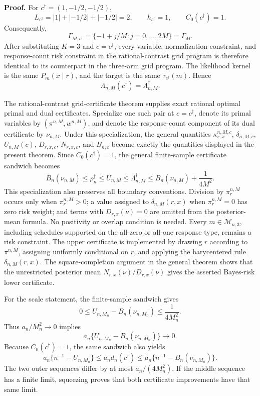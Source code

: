 \textbf{Proof.}
For \(c^\dagger=(1,-1/2,-1/2)\),
\[
 L_{c^\dagger}=|1|+|-1/2|+|-1/2|=2,
 \qquad h_{c^\dagger}=1,
 \qquad C_0(c^\dagger)=1.
\]
Consequently,
\[
 \Gamma_{M,c^\dagger}
 =\{-1+j/M:j=0,\ldots,2M\}
 =\Gamma_M.
\]
After substituting \(K=3\) and \(c=c^\dagger\), every variable, normalization constraint, and response-count risk constraint in the rational-contrast grid program is therefore identical to its counterpart in the three-arm grid program.  The likelihood kernel is the same \(P_m(x\mid r)\), and the target is the same \(\tau_{c^\dagger}(m)\).  Hence
\[
 \Lambda_{n,M}(c^\dagger)=\Lambda_{n,M}^\dagger.
\]

The rational-contrast grid-certificate theorem supplies exact rational optimal primal and dual certificates.  Specialize one such pair at \(c=c^\dagger\), denote its primal variables by \((\pi^{n,M},w^{n,M})\), and denote the response-count component of its dual certificate by \(\nu_{n,M}\).  Under this specialization, the general quantities \(\kappa_{r,x}^{n,M,c}\), \(\delta_{n,M,c}\), \(U_{n,M}(c)\), \(D_{r,x,c}\), \(N_{r,x,c}\), and \(B_{n,c}\) become exactly the quantities displayed in the present theorem.  Since \(C_0(c^\dagger)=1\), the general finite-sample certificate sandwich becomes
\[
 B_n(\nu_{n,M})
 \leq \rho_n^\dagger
 \leq U_{n,M}
 \leq \Lambda_{n,M}^\dagger
 \leq B_n(\nu_{n,M})+\frac{1}{4M^2}.
\]
This specialization also preserves all boundary conventions.  Division by \(\pi_r^{n,M}\) occurs only when \(\pi_r^{n,M}>0\); a value assigned to \(\delta_{n,M}(r,x)\) when \(\pi_r^{n,M}=0\) has zero risk weight; and terms with \(D_{r,x}(\nu)=0\) are omitted from the posterior-mean formula.  No positivity or overlap condition is needed.  Every \(m\in\mathcal M_{n,3}\), including schedules supported on the all-zero or all-one response type, remains a risk constraint.  The upper certificate is implemented by drawing \(r\) according to \(\pi^{n,M}\), assigning uniformly conditional on \(r\), and applying the barycentered rule \(\delta_{n,M}(r,x)\).  The square-completion argument in the general theorem shows that the unrestricted posterior mean \(N_{r,x}(\nu)/D_{r,x}(\nu)\) gives the asserted Bayes-risk lower certificate.

For the scale statement, the finite-sample sandwich gives
\[
 0\leq U_{n,M_n}-B_n(\nu_{n,M_n})
 \leq \frac{1}{4M_n^2}.
\]
Thus \(a_n/M_n^2\to0\) implies
\[
 a_n\{U_{n,M_n}-B_n(\nu_{n,M_n})\}\longrightarrow0.
\]
Because \(C_0(c^\dagger)=1\), the same sandwich also yields
\[
 a_n\{n^{-1}-U_{n,M_n}\}
 \leq a_nd_n(c^\dagger)
 \leq a_n\{n^{-1}-B_n(\nu_{n,M_n})\}.
\]
The two outer sequences differ by at most \(a_n/(4M_n^2)\).  If the middle sequence has a finite limit, squeezing proves that both certificate improvements have that same limit.


